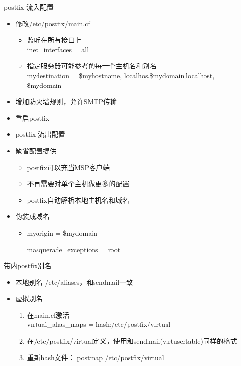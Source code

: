 \begin{frame}{postfix 流入配置}
\begin{itemize}
\item 修改/etc/postfix/main.cf

\begin{itemize}
\item 监听在所有接口上\\
inet\_interfaces = all
\item 指定服务器可能参考的每一个主机名和别名\\
mydestination = \$myhostname, localhos.\$mydomain,localhost, \$mydomain
\end{itemize}
\item 增加防火墙规则，允许SMTP传输
\item 重启postfix
\item postfix 流出配置
\item 缺省配置提供

\begin{itemize}
\item postfix可以充当MSP客户端
\item 不再需要对单个主机做更多的配置
\item postfix自动解析本地主机名和域名
\end{itemize}
\item 伪装成域名

\begin{itemize}
\item myorigin = \$mydomain


masquerade\_exceptions = root

\end{itemize}
\end{itemize}

\end{frame} 
\begin{frame}{带内postfix别名}
\begin{itemize}
\item 本地别名 /etc/aliases，和sendmail一致
\item 虚拟别名

\begin{enumerate}
\item 在main.cf激活\\
virtual\_alias\_maps = hash:/etc/postfix/virtual
\item 在/etc/postfix/virtual定义，使用和sendmail(virtusertable)同样的格式
\item 重新hash文件： postmap /etc/postfix/virtual
\end{enumerate}
\end{itemize}

\end{frame} 
